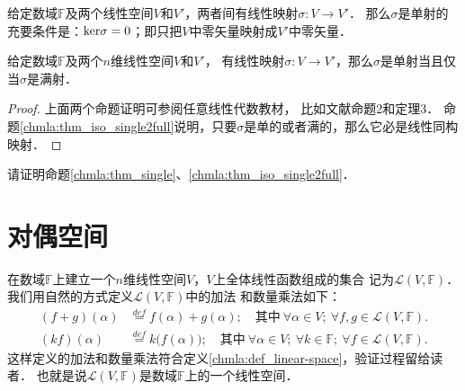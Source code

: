 \begin{proposition}\label{chmla:thm_single}
    给定数域$\mathbb{F}$及两个线性空间$V$和$V'$，两者间有线性映射$\sigma:V\to V'$．
    那么$\sigma$是单射的充要条件是：${\rm ker}\sigma = 0$；即只把$V$中零矢量映射成$V'$中零矢量．
\end{proposition}
\begin{proposition}\label{chmla:thm_iso_single2full}
    给定数域$\mathbb{F}$及两个$n$维线性空间$V$和$V'$，
    有线性映射$\sigma:V\to V'$，那么$\sigma$是单射当且仅当$\sigma$是满射．
\end{proposition}

\begin{proof}
    上面两个命题证明可参阅任意线性代数教材，
    比如文献\parencite[\S 9.2]{qiuws-2019-v2}命题2和定理3．
    命题\ref{chmla:thm_iso_single2full}说明，只要$\sigma$是单的或者满的，那么它必是线性同构映射．
\end{proof}

\begin{exercise}
	请证明命题\ref{chmla:thm_single}、\ref{chmla:thm_iso_single2full}．
\end{exercise}


\section{对偶空间}\label{chmla:sec_dual}

在数域$\mathbb{F}$上建立一个$n$维线性空间$V$，$V$上全体线性函数组成的集合
记为$\mathscr{L}(V,\mathbb{F})$．我们用自然的方式定义$\mathscr{L}(V,\mathbb{F})$中的加法
和数量乘法如下：
\begin{align}
    (f+g)(\alpha)  &\overset{def}{=}  f(\alpha)+g(\alpha); \quad
    \text{其中}\ \forall \alpha \in V; \ \forall f,g \in \mathscr{L}(V,\mathbb{F}) .  \\
    (k f) (\alpha) &\overset{def}{=}  k \bigl( f(\alpha)\bigr); \quad
    \text{其中}\ \forall \alpha \in V;\ \forall k \in \mathbb{F}; \
    \forall f \in \mathscr{L}(V,\mathbb{F}) .
\end{align}
这样定义的加法和数量乘法符合定义\ref{chmla:def_linear-space}，验证过程留给读者．
也就是说$\mathscr{L}(V,\mathbb{F})$是数域$\mathbb{F}$上的一个线性空间．

